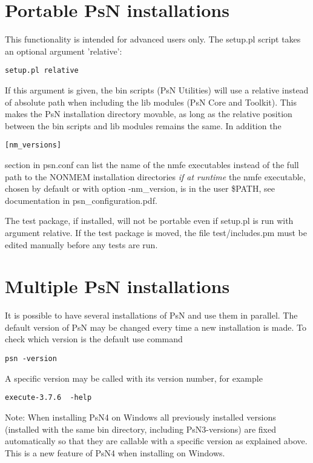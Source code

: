 \section{Portable PsN installations}
This functionality is intended for advanced users only. The setup.pl script
takes an optional argument 'relative':
\begin{verbatim}
setup.pl relative
\end{verbatim}
If this argument is given, the bin scripts (PsN Utilities) 
will use a relative instead of 
absolute path when
including the lib modules (PsN Core and Toolkit). 
This makes the PsN installation directory movable,
as long as the relative position between the bin scripts and lib modules
remains the same. In addition the
\begin{verbatim}
[nm_versions]
\end{verbatim}
section in psn.conf can list the name of the nmfe executables instead of
the full path to the NONMEM installation directories 
\emph{if at runtime}
the nmfe executable, chosen by default or with option -nm\_version,
is in the user \$PATH, 
see documentation in psn\_configuration.pdf.

The test package, if installed, will not be portable even if setup.pl is run
with argument relative. If the test package is moved, the file test/includes.pm
must be edited manually before any tests are run.

\section{Multiple PsN installations}
It is possible to have several installations of PsN and use them in parallel. 
The default version of PsN may be changed every time a new installation is made. 
To check which version is the default use command
\begin{verbatim}
psn -version
\end{verbatim}

\noindent A specific version may be called with its version number, for example

\begin{verbatim}
execute-3.7.6  -help 
\end{verbatim}

\noindent Note: When installing PsN4 on Windows all previously installed versions 
(installed with the same bin directory,
including PsN3-versions) are fixed automatically so that they are callable with a specific version as 
explained above. This is a new feature of PsN4 when installing on Windows.


